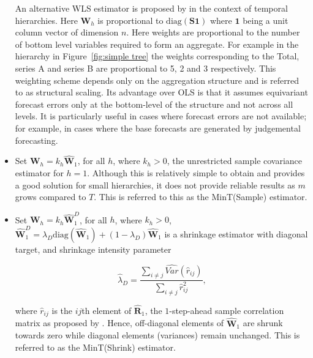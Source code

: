 \documentclass[graybox]{svmult}
\begin{document}
\begin{itemize}
        An alternative WLS estimator is proposed by \citet{AthEtAl2017} in the context of temporal hierarchies. Here $\bm{W}_{h}$ is proportional to $\text{diag}(\bm{S}\bm{1})$ where $\bm{1}$ being a unit column vector of dimension $n$.  Here weights are proportional to the number of bottom level variables required to form an aggregate. For example in the hierarchy in Figure~\ref{fig:simple tree} the weights corresponding to the Total, series A and series B are proportional to 5, 2 and 3 respectively.
        This weighting scheme depends only on the aggregation structure and is referred to as structural scaling. Its advantage over OLS is that it assumes equivariant forecast errors only at the bottom-level of the structure and not across all levels. It is particularly useful in cases where forecast errors are not available; for example, in cases where the base forecasts are generated by judgemental forecasting.

    \item  Set $\bm{W}_{h}=k_{h}\hat{\bm{W}}_{1}$, for all $h$, where $k_{h} > 0$, the unrestricted sample covariance estimator for $h=1$. Although this is relatively simple to obtain and provides a good solution for small hierarchies, it does not provide reliable results as $m$ grows compared to $T$. This is referred to this as the MinT(Sample) estimator.
    \item Set $\bm{W}_{h}=k_{h}\hat{\bm{W}}_{1}^D$, for all $h$, where $k_{h} > 0$, $\hat{\bm{W}}^{D}_{1} = \lambda_{D} \text{diag}(\hat{\bm{W}}_{1}) + (1 - \lambda_{D})\hat{\bm{W}}_{1}$ is a shrinkage estimator with diagonal target, and shrinkage intensity parameter

        $$\hat{\lambda}_{D} = \frac{\sum_{i \ne j}\hat{Var}(\hat{r}_{ij})}{\sum_{i \ne j}\hat{r}_{ij}^2},$$


        where $\hat{r}_{ij}$ is the $ij$th element of $\hat{\bm{R}}_{1}$, the $1$-step-ahead sample correlation matrix as proposed by \citet{Schafer2005}. Hence, off-diagonal elements of $\hat{\bm{W}}_1$ are shrunk towards zero while diagonal elements (variances) remain unchanged. This is referred to as the MinT(Shrink) estimator.
\end{itemize}
\end{document}
